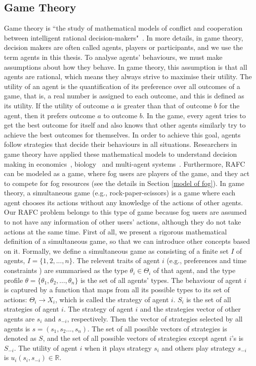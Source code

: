 \documentclass[11pt]{phdthesis}
\begin{document}
\subsection{Game Theory} \label{game theory}

Game theory is ``the study of mathematical models of conflict and cooperation between intelligent rational decision-makers"~\citep{roger1991game}. In more details, in game theory, decision makers are often called agents, players or participants, and we use the term agents in this thesis. To analyse agents' behaviours, we must make assumptions about how they behave. In game theory, this assumption is that all agents are rational, which means they always strive to maximise their utility. The utility of an agent is the quantification of its preference over all outcomes of a game, that is, a real number is assigned to each outcome, and this is defined as its utility. If the utility of outcome $ a $ is greater than that of outcome $ b $ for the agent, then it prefers outcome $ a $ to outcome $ b $. In the game, every agent tries to get the best outcome for itself and also knows that other agents similarly try to achieve the best outcomes for themselves. In order to achieve this goal, agents follow strategies that decide their behaviours in all situations. Researchers in game theory have applied these mathematical models to understand decision making in economics~\citep{gu2005price,kelly2003decision}, biology~\citep{hammerstein1994game,dugatkin2000game} and multi-agent systems~\citep{parsons2002game,semsar2009multi}. Furthermore, RAFC can be modeled as a game, where fog users are players of the game, and they act to compete for fog resources (see the details in Section \ref{model of fog}).
In game theory, a simultaneous game (e.g., rock-paper-scissors) is a game where each agent chooses its actions without any knowledge of the actions of other agents. Our RAFC problem belongs to this type of game because fog users are assumed to not have any information of other users' actions, although they do not take actions at the same time. First of all, we present a rigorous mathematical definition of a simultaneous game, so that we can introduce other concepts based on it.
Formally, we define a simultaneous game as consisting of a finite set $I$ of agents, $I = \{1,2,...,n \}$. The relevent traits of agent $ i $ (e.g., preferences and time constraints ) are summarised as the type $ \theta_i \in \Theta_{i} $ of that agent, and the type profile $ \theta = \{ \theta_1, \theta_2, \ldots, \theta_n\} $ is the set of all agents' types. The behaviour of agent $ i $ is captured by a function that maps from all its possible types to its set of actions: $\Theta_i \rightarrow X_i$, which is called the strategy of agent $ i $. $S_i$ is the set of all strategies of agent $i$. The strategy of agent $i$ and the strategies vector of other agents are $s_i$ and $s_{-i}$, respectively. Then the vector of strategies selected by all agents is $s=(s_1,s_2...,s_n)$. The set of all possible vectors of strategies is denoted as $S$, and the set of all possible vectors of strategies except agent $i$'s is $S_{-i}$. The utility of agent $i$ when it plays strategy $s_i$ and others play strategy $s_{-i}$ is $u_i(s_i,s_{-i}) \in \mathbb{R}$. 
\end{document}
